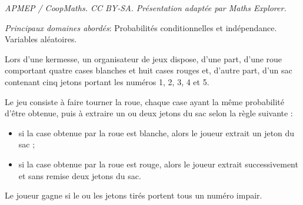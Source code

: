 \documentclass[10pt]{article}
\begin{document}
\noindent\textit{APMEP / CoopMaths. CC BY-SA. Présentation adaptée par Maths Explorer.}\par\medskip
\medskip

\emph{Principaux domaines abordés}: Probabilités conditionnelles et indépendance. Variables aléatoires.

\medskip

Lors d'une kermesse, un organisateur de jeux dispose, d'une part, d'une roue comportant quatre cases blanches et huit cases rouges et, d'autre part, d'un sac contenant cinq jetons portant les numéros 1, 2, 3, 4 et 5.

Le jeu consiste à faire tourner la roue, chaque case ayant la même probabilité d'être obtenue, puis à extraire un ou deux jetons du sac selon la règle suivante :

\setlength\parindent{1cm}
\begin{itemize}
\item[$\bullet~~$] si la case obtenue par la roue est blanche, alors le joueur extrait un jeton du sac ;
\item[$\bullet~~$] si la case obtenue par la roue est rouge, alors le joueur extrait successivement et sans remise deux jetons du sac.
\end{itemize}
\setlength\parindent{0cm}

Le joueur gagne si le ou les jetons tirés portent tous un numéro impair.

\medskip
\end{document}

